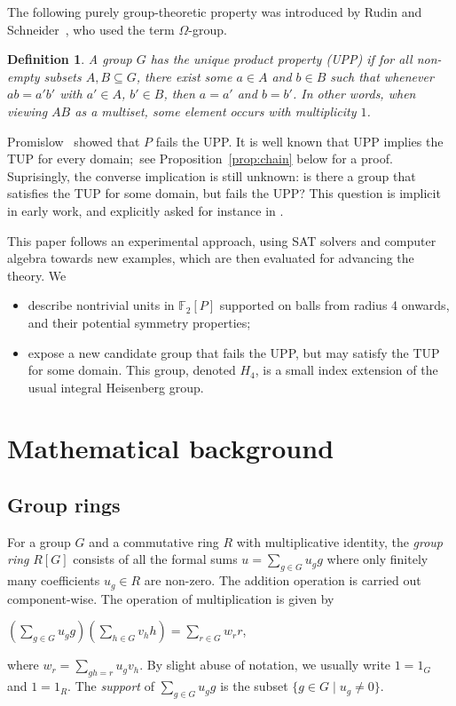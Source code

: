 \documentclass[11pt]{amsart}
\theoremstyle{mythm}
\theoremstyle{mydef}
\newtheorem{definition}[theorem]{Definition}
\theoremstyle{myrem}
\numberwithin{equation}{section}
\newcommand{\bi}{\begin{itemize}}
\newcommand{\ei}{\end{itemize}}
\begin{document}
The  following purely  group-theoretic property was introduced by  Rudin and Schneider~\cite{Rudin.Schneider:64}, who used the term $\Omega$-group. 
\begin{definition} \label{df:UPP}	A group $G$ has the  \emph{unique product property} (UPP)   if for all non-empty subsets $A,B\subseteq G$,  there exist some $a\in A$ and $b \in B$ such that whenever $ab=a'b'$ with $a'\in A$, $b'\in B$, then $a=a'$ and $b=b'$. In other words, when viewing $AB$ as a multiset, some element occurs  with multiplicity $1$. 
\end{definition}

 Promislow~\cite{P} showed that $P$ fails the UPP. It is well known that UPP   implies the TUP for every domain;~see Proposition~\ref{prop:chain} below for a proof.   Suprisingly, the converse implication is still unknown: is   there  a group that satisfies the TUP for some domain, but fails the UPP? This question is implicit in early work, and explicitly  asked for instance in \cite{G}.

This  paper follows an experimental approach,  using SAT solvers and computer algebra  towards   new examples, which are then evaluated for advancing the  theory. We 
\bi 
\item describe  nontrivial  units in $\mathbb{F}_2[P]$ supported on   balls from radius   4 onwards, and their potential symmetry properties;
\item expose a new candidate group  that fails the UPP, but may   satisfy the TUP for some domain.  This group,  denoted $H_4$, is a small index extension of the usual integral Heisenberg group.
\ei






 
\section{Mathematical background}


\subsection{Group rings}   For a group $G$ and a commutative ring $R$ with multiplicative identity, the \textit{group ring} $R[G]$ consists of all the  formal sums $u=\sum_{g\in G} u_gg$ where only finitely many coefficients $u_g\in R$ are non-zero. The addition operation  is carried out component-wise. The operation  of multiplication is given by  \begin{center} $(\sum_{g\in G} u_gg )(\sum_{h\in G} v_hh )= \sum_{r \in G} w_r r$,\end{center} where $w_r = \sum_{gh = r} u_gv_h$. By slight abuse of notation, we usually write $1=1_G$ and $1=1_R$. The \emph{support} of $\sum_{g\in G}u_g g$ is the subset $\{g\in G \mid u_g\ne 0\}$. 
\end{document}
